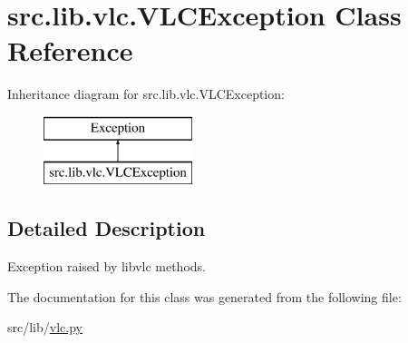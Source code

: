\hypertarget{classsrc_1_1lib_1_1vlc_1_1VLCException}{}\section{src.\+lib.\+vlc.\+V\+L\+C\+Exception Class Reference}
\label{classsrc_1_1lib_1_1vlc_1_1VLCException}
Inheritance diagram for src.\+lib.\+vlc.\+V\+L\+C\+Exception\+:\begin{figure}[H]
\begin{center}
\leavevmode
\includegraphics[height=2.000000cm]{classsrc_1_1lib_1_1vlc_1_1VLCException}
\end{center}
\end{figure}


\subsection{Detailed Description}
\begin{DoxyVerb}Exception raised by libvlc methods.
\end{DoxyVerb}
 

The documentation for this class was generated from the following file\+:\begin{DoxyCompactItemize}
\item 
src/lib/\hyperlink{vlc_8py}{vlc.\+py}\end{DoxyCompactItemize}
